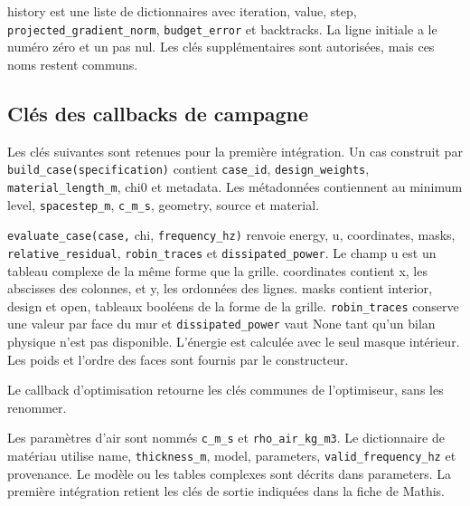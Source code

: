 \documentclass[11pt,a4paper]{article}
\begin{document}
{\small\ttfamily history} est une liste de dictionnaires avec {\small\ttfamily iteration}, {\small\ttfamily value}, {\small\ttfamily step}, {\small\ttfamily \nolinkurl{projected_gradient_norm}}, {\small\ttfamily \nolinkurl{budget_error}} et {\small\ttfamily backtracks}. La ligne initiale a le numéro zéro et un pas nul. Les clés supplémentaires sont autorisées, mais ces noms restent communs.

\subsection{Clés des callbacks de campagne}

Les clés suivantes sont retenues pour la première intégration. Un cas construit par {\small\ttfamily \nolinkurl{build_case(specification)}} contient {\small\ttfamily \nolinkurl{case_id}}, {\small\ttfamily \nolinkurl{design_weights}}, {\small\ttfamily \nolinkurl{material_length_m}}, {\small\ttfamily chi0} et {\small\ttfamily metadata}. Les métadonnées contiennent au minimum {\small\ttfamily level}, {\small\ttfamily \nolinkurl{spacestep_m}}, {\small\ttfamily \nolinkurl{c_m_s}}, {\small\ttfamily geometry}, {\small\ttfamily source} et {\small\ttfamily material}.

{\small\ttfamily \nolinkurl{evaluate_case(case,} chi, \nolinkurl{frequency_hz)}} renvoie {\small\ttfamily energy}, {\small\ttfamily u}, {\small\ttfamily coordinates}, {\small\ttfamily masks}, {\small\ttfamily \nolinkurl{relative_residual}}, {\small\ttfamily \nolinkurl{robin_traces}} et {\small\ttfamily \nolinkurl{dissipated_power}}. Le champ {\small\ttfamily u} est un tableau complexe de la même forme que la grille. {\small\ttfamily coordinates} contient {\small\ttfamily x}, les abscisses des colonnes, et {\small\ttfamily y}, les ordonnées des lignes. {\small\ttfamily masks} contient {\small\ttfamily interior}, {\small\ttfamily design} et {\small\ttfamily open}, tableaux booléens de la forme de la grille. {\small\ttfamily \nolinkurl{robin_traces}} conserve une valeur par face du mur et {\small\ttfamily \nolinkurl{dissipated_power}} vaut {\small\ttfamily None} tant qu'un bilan physique n'est pas disponible. L'énergie est calculée avec le seul masque intérieur. Les poids et l'ordre des faces sont fournis par le constructeur.

Le callback d'optimisation retourne les clés communes de l'optimiseur, sans les renommer.

Les paramètres d'air sont nommés {\small\ttfamily \nolinkurl{c_m_s}} et {\small\ttfamily \nolinkurl{rho_air_kg_m3}}. Le dictionnaire de matériau utilise {\small\ttfamily name}, {\small\ttfamily \nolinkurl{thickness_m}}, {\small\ttfamily model}, {\small\ttfamily parameters}, {\small\ttfamily \nolinkurl{valid_frequency_hz}} et {\small\ttfamily provenance}. Le modèle ou les tables complexes sont décrits dans {\small\ttfamily parameters}. La première intégration retient les clés de sortie indiquées dans la fiche de Mathis.
\end{document}

